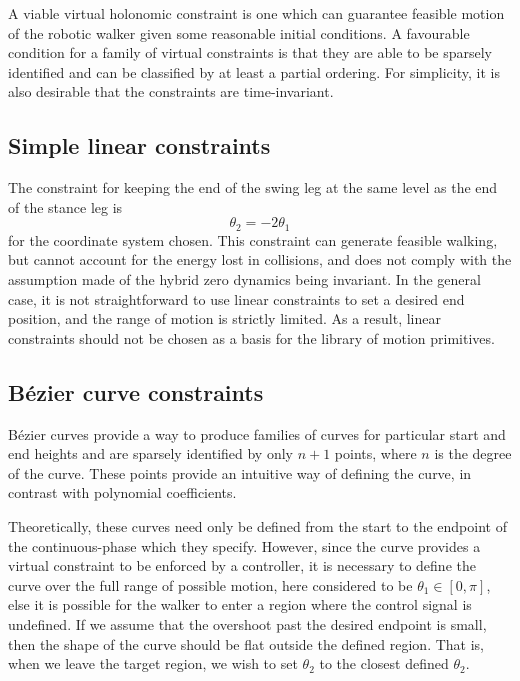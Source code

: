 A viable virtual holonomic constraint is one which can guarantee feasible motion of the robotic walker given some reasonable initial conditions. A favourable condition for a family of virtual constraints is that they are able to be sparsely identified and can be classified by at least a partial ordering. For simplicity, it is also desirable that the constraints are time-invariant.

\subsection{Simple linear constraints}
The constraint for keeping the end of the swing leg at the same level as the end of the stance leg is
\begin{equation}
	\theta_2 = -2\theta_1
\end{equation}
for the coordinate system chosen. This constraint can generate feasible walking, but cannot account for the energy lost in collisions, and does not comply with the assumption made of the hybrid zero dynamics being invariant. In the general case, it is not straightforward to use linear constraints to set a desired end position, and the range of motion is strictly limited. As a result, linear constraints should not be chosen as a basis for the library of motion primitives.

\subsection{Bézier curve constraints}
Bézier curves provide a way to produce families of curves for particular start and end heights and are sparsely identified by only $n+1$ points, where $n$ is the degree of the curve. These points provide an intuitive way of defining the curve, in contrast with polynomial coefficients.
\par

Theoretically, these curves need only be defined from the start to the endpoint of the continuous-phase which they specify. However, since the curve provides a virtual constraint to be enforced by a controller, it is necessary to define the curve over the full range of possible motion, here considered to be $\theta_1 \in \left[0, \pi\right]$, else it is possible for the walker to enter a region where the control signal is undefined. If we assume that the overshoot past the desired endpoint is small, then the shape of the curve should be flat outside the defined region. That is, when we leave the target region, we wish to set $\theta_2$ to the closest defined $\theta_2$. \\ \par

